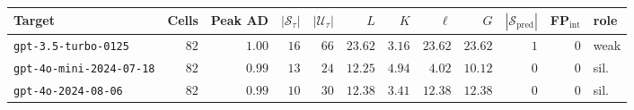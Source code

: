 \footnotesize
\setlength{\tabcolsep}{2.5pt}
\begin{tabular}{lrrrrrrrrrrl}
\toprule
Target                                & Cells & Peak AD & $|\mathcal{S}_\tau|$ & $|\mathcal{U}_\tau|$ & $L$ & $K$ & $\ell$ & $G$ & $|\mathcal{S}_{\mathrm{pred}}|$ & FP$_{\mathrm{int}}$ & role \\
\midrule
\texttt{gpt-3.5-turbo-0125}           & $82$ & $1.00$ & $16$ & $66$ & $23.62$ & $3.16$ & $23.62$ & $23.62$ & $1$ & $0$ & weak \\
\texttt{gpt-4o-mini-2024-07-18}       & $82$ & $0.99$ & $13$ & $24$ & $12.25$ & $4.94$ & $ 4.02$ & $10.12$ & $0$ & $0$ & sil. \\
\texttt{gpt-4o-2024-08-06}            & $82$ & $0.99$ & $10$ & $30$ & $12.38$ & $3.41$ & $12.38$ & $12.38$ & $0$ & $0$ & sil. \\
\bottomrule
\end{tabular}
